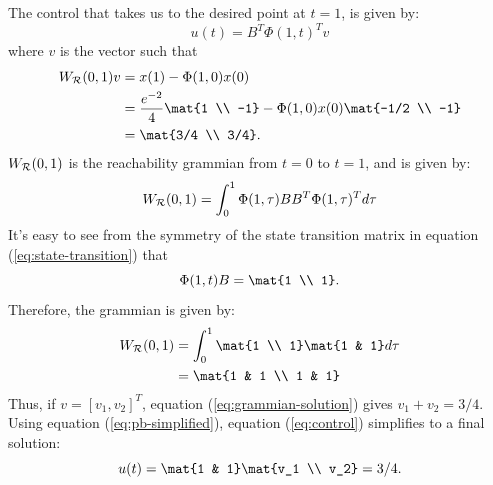 \documentclass{homework}
\begin{document}
\begin{letterenum}
\item The control that takes us to the desired point
at $t=1$, is given by:
\begin{equation}
    u(t) = B^T \Phi(1, t)^T v
    \label{eq:control}
\end{equation}
where $v$ is the vector such that
\begin{align}
    W_\reach(0, 1) v &= x(1) - \Phi(1, 0) x(0) \\
        &= \frac{e^{-2}}{4} \mat{1 \\ -1} - \Phi (1, 0) x(0) \mat{-1/2 \\ -1} \\
        &= \mat{3/4 \\ 3/4}.
        \label{eq:grammian-solution}
\end{align}
$W_{\mathcal{R}}(0, 1)$ is the reachability grammian from $t=0$ to $t=1$, and is
given by:
\begin{equation*}
    W_{\mathcal{R}}(0, 1) = \int_{0}^{1} \Phi(1, \tau) B B^T \Phi(1, \tau)^T d\tau
\end{equation*}
It's easy to see from the symmetry of the state transition matrix in
equation (\ref{eq:state-transition}) that 
\begin{equation}
    \Phi(1, t) B = \mat{1 \\ 1}.
    \label{eq:pb-simplified}
\end{equation}
Therefore, the grammian is given by:
\begin{align*}
    W_\reach(0, 1) &= \int_{0}^{1} \mat{1 \\ 1} \mat{1 & 1} d\tau \\
        &= \mat{1 & 1 \\ 1 & 1}
\end{align*}
Thus, if $v = [v_1, v_2]^T$, equation (\ref{eq:grammian-solution}) gives
$v_1 + v_2 = 3/4$. Using equation (\ref{eq:pb-simplified}),
equation (\ref{eq:control}) simplifies to a final solution:
\begin{equation*}
    u(t) = \mat{1 & 1} \mat{v_1 \\ v_2} = 3/4.
\end{equation*}
\end{letterenum}

\subsection{}
\end{document}
